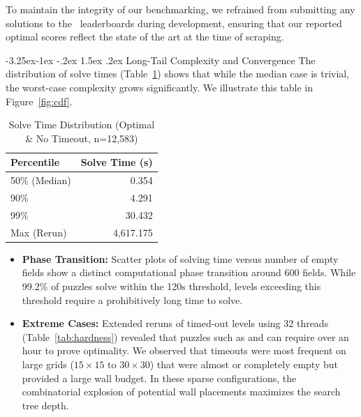 \documentclass[sigconf,nonacm]{acmart}
\makeatletter
\renewcommand{\subsection}{\@startsection{subsection}{2}{\z@}%
  {-3.25ex\@plus -1ex \@minus -.2ex}%
  {1.5ex \@plus .2ex}%
  {\reset@font\large\bfseries}}
\makeatother
\begin{document}

To maintain the integrity of our benchmarking, we refrained from submitting any solutions to the \horse\ leaderboards during development, ensuring that our reported optimal scores reflect the state of the art at the time of scraping.

\subsection{Long-Tail Complexity and Convergence}
The distribution of solve times (Table~\ref{tab:dist}) shows that while the median case is trivial, the worst-case complexity grows significantly. We illustrate this table in Figure~\ref{fig:cdf}. 

\begin{table}[h]
  \centering
  \caption{Solve Time Distribution (Optimal \& No Timeout, n=12,583)}
  \label{tab:dist}
  \begin{tabular}{lr}
    \toprule
    Percentile & Solve Time (s) \\
    \midrule
    50\% (Median) & 0.354 \\
    90\% & 4.291 \\
    99\% & 30.432 \\
    Max (Rerun) & 4,617.175 \\
    \bottomrule
  \end{tabular}
\end{table}

\begin{itemize}
    \item \textbf{Phase Transition:} Scatter plots of solving time versus number of empty fields show a distinct computational phase transition around 600 fields. While 99.2\% of puzzles solve within the 120s threshold, levels exceeding this threshold require a prohibitively long time to solve.
    \item \textbf{Extreme Cases:} Extended reruns of timed-out levels using 32 threads (Table~\ref{tab:hardness}) revealed that puzzles such as  and  can require over an hour to prove optimality. We observed that timeouts were most frequent on large grids ($15\times15$ to $30\times30$) that were almost or completely empty but provided a large wall budget. In these sparse configurations, the combinatorial explosion of potential wall placements maximizes the search tree depth.
\end{itemize}
\end{document}
